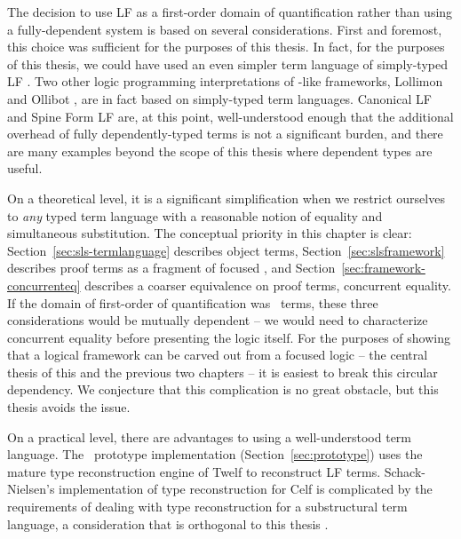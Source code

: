 The decision to use LF as a first-order domain of quantification
rather than using a fully-dependent system is based on several
considerations. First and foremost, this choice was sufficient for the
purposes of this thesis. In fact, for the purposes of this thesis, we
could have used an even simpler term language of simply-typed LF
\cite{pfenning08church}. Two other logic programming interpretations
of \sls-like frameworks, Lollimon \cite{lopez05monadic} and Ollibot
\cite{pfenning09substructural}, are in fact based on simply-typed term
languages. Canonical LF and Spine Form LF are, at this point,
well-understood enough that the additional overhead of fully
dependently-typed terms is not a significant burden, and there are
many examples beyond the scope of this thesis where dependent types are
useful.

On a theoretical level, it is a significant simplification when we
restrict ourselves to {\it any} typed term language with a reasonable
notion of equality and simultaneous substitution. The conceptual
priority in this chapter is clear: Section~\ref{sec:sls-termlanguage}
describes object terms, Section~\ref{sec:slsframework} describes proof
terms as a fragment of focused \ollll, and
Section~\ref{sec:framework-concurrenteq} describes a coarser
equivalence on proof terms, concurrent equality. If the domain of
first-order of quantification was \sls~terms, these three
considerations would be mutually dependent -- we would need to
characterize concurrent equality before presenting the logic
itself. For the purposes of showing that a logical framework can be
carved out from a focused logic -- the central thesis of this and the
previous two chapters -- it is easiest to break this circular
dependency. We conjecture that this complication is no great obstacle,
but this thesis avoids the issue.

On a practical level, there are advantages to using a well-understood
term language. The \sls~prototype implementation
(Section~\ref{sec:prototype}) uses the mature type reconstruction
engine of Twelf to reconstruct LF terms. Schack-Nielsen's
implementation of type reconstruction for Celf is complicated by the
requirements of dealing with type reconstruction for a substructural
term language, a consideration that is orthogonal to this
thesis \cite{schacknielsen08celf}. 

